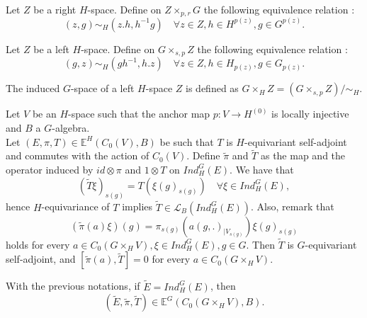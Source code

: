 Let $Z$ be a right $H$-space. Define on $Z\times_{p,r} G$ the following equivalence relation :
\[(z,g)\sim_H (z.h, h^{-1}g)\quad \forall z\in Z, h\in H^{p(z)},g\in G^{p(z)}.\]

Let $Z$ be a left $H$-space. Define on $G \times_{s,p} Z $ the following equivalence relation :
\[(g,z)\sim_H (gh^{-1}, h.z)\quad \forall z\in Z, h\in H_{p(z)},g\in G_{p(z)}.\]

\begin{definition}
The induced $G$-space of a left $H$-space $Z$ is defined as $ G\times_H Z = (G \times_{s,p} Z) / \sim_H$. 
\end{definition}

Let $V$ be an $H$-space such that the anchor map $p : V\rightarrow H^{(0)}$ is locally injective and $B$ a $G$-algebra. \\

Let $(E,\pi,T)\in \mathbb E^H(C_0(V),B)$ be such that $T$ is $H$-equivariant self-adjoint and commutes with the action of $C_0(V)$. Define $\tilde\pi$ and $\tilde T$ as the map and the operator induced by $id\otimes \pi$ and $1\otimes T$ on $Ind_H^G (E)$. We have that 
\[(\tilde T\xi)_{s(g)} = T(\xi(g)_{s(g)})\quad \forall \xi \in Ind_H^G(E),  \]
hence $H$-equivariance of $T$ implies $\tilde T\in\mathcal L_B(Ind_H^G (E))$. Also, remark that 
\[(\tilde \pi(a)\xi)(g) =\pi_{s(g)} (a(g,.)_{|V_{s(g)}} ) \xi (g)_{s(g)}\]
holds for every $a\in C_0(G\times_H V),\xi \in Ind_H^G(E), g\in G$. Then $\tilde T$ is $G$-equivariant self-adjoint, and $[\tilde \pi(a),\tilde T]=0$ for every $a\in C_0(G\times_H V)$.

\begin{lem}
With the previous notations, if $\tilde E= Ind_H^G (E)$, then 
\[(\tilde E, \tilde \pi, \tilde T)\in \mathbb E^G(C_0(G\times_H V),B).\]
\end{lem}

